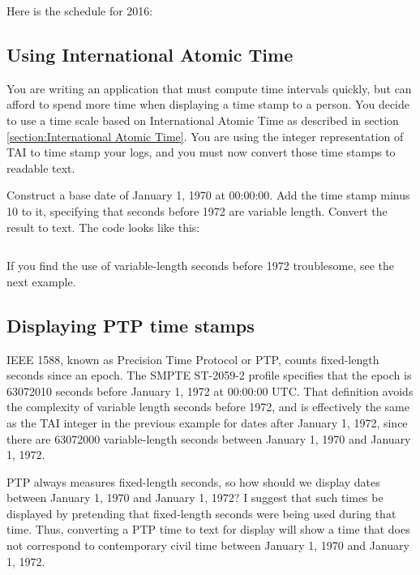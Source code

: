 \documentclass[letterpaper,twoside]{article}
\begin{document}
Here is the schedule for 2016:


\subsection{Using International Atomic Time}
\label{example:TAI}
You are writing an application that must compute time intervals quickly,
but can afford to spend more time when displaying a time stamp to a person.
You decide to use a time scale based on International Atomic Time as described
in section \ref{section:International Atomic Time}.  You are using the
integer representation of TAI to time stamp your logs, and you must now convert
those time stamps to readable text.

Construct a base date of January 1, 1970 at 00:00:00.  Add the time stamp
minus 10 to it, specifying that seconds before 1972 are variable length.
Convert the result to text.  The code looks like this:
\inputminted[firstline=41,lastline=67]{c}{example_04.c}

If you find the use of variable-length seconds before 1972 troublesome,
see the next example.

\subsection{Displaying PTP time stamps}
\label{example:PTP}
IEEE 1588, known as Precision Time Protocol or PTP, counts fixed-length
seconds since an epoch.  The SMPTE ST-2059-2 profile specifies that the epoch is
\num{63072010} seconds before January 1, 1972 at 00:00:00 UTC.  That definition
avoids the complexity of variable length seconds before 1972, and is
effectively the same as the TAI integer in the previous example
for dates after January 1, 1972, since there are \num{63072000}
variable-length seconds between January 1, 1970 and January 1, 1972.

PTP always measures fixed-length seconds, so how should we display
dates between January 1, 1970 and January 1, 1972?  I suggest that
such times be displayed by pretending that fixed-length seconds
were being used during that time.  Thus, converting a PTP time
to text for display will show a time that does not correspond to
contemporary civil time between January 1, 1970 and January 1, 1972.
\end{document}
